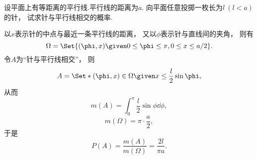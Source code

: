 \begin{example}[布冯投针问题]
设平面上有等距离的平行线.平行线的距离为\(a\).
向平面任意投掷一枚长为\(l\ (l<a)\)的针，
试求针与平行线相交的概率.
\begin{solution}
以\(x\)表示针的中点与最近一条平行线的距离，
又以\(\phi\)表示针与直线间的夹角，
则有\begin{equation*}
	\Omega = \Set{ (\phi,x) \given 0 \leq \phi \leq \pi, 0 \leq x \leq a/2 }.
\end{equation*}
令\(A\)为“针与平行线相交”，
则\begin{equation*}
	A = \Set*{ (\phi,x)\in\Omega \given x \leq \frac{l}{2} \sin\phi },
\end{equation*}
从而\begin{equation*}
	m(A) = \int_0^\pi\frac{l}{2} \sin\phi \dd{\phi},
\end{equation*}\begin{equation*}
	m(\Omega) = \pi \cdot \frac{a}{2},
\end{equation*}
于是\begin{equation*}
	P(A)
	= \frac{m(A)}{m(\Omega)}
	= \frac{2l}{\pi a}.
\end{equation*}
\end{solution}
\end{example}
